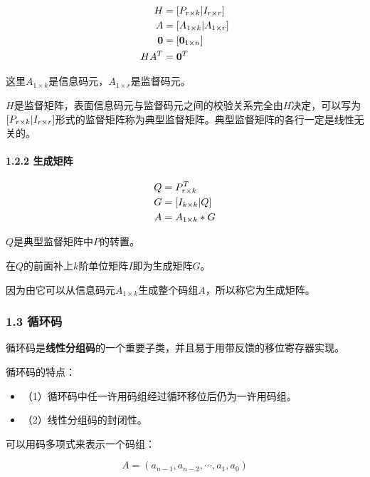 \documentclass[
]{article}
\begin{document}
\begin{align}
H &= [P_{r \times k} \space | \space I_{r \times r}]\\
A &= [A_{1 \times k} \space | \space A_{1 \times r}]\\
\boldsymbol0 &= [\boldsymbol0_{1 \times n}]\\
HA^T &= \boldsymbol0^T \\
\end{align}

这里$A_{1 \times k}$是信息码元，$A_{1 \times r}$是监督码元。

$H$是监督矩阵，表面信息码元与监督码元之间的校验关系完全由$H$决定，可以写为$[P_{r \times k} \space | \space I_{r \times r}]$形式的监督矩阵称为典型监督矩阵。典型监督矩阵的各行一定是线性无关的。

\hypertarget{header-n20}{%
\paragraph{1.2.2 生成矩阵}\label{header-n20}}

\begin{align}
Q &= P_{r \times k}^T\\
G &= [I_{k \times k} \space | \space Q]\\
A &= A_{1 \times k}*G\\
\end{align}

$Q$是典型监督矩阵中$P$的转置。

在$Q$的前面补上$k$阶单位矩阵$I$即为生成矩阵$G$。

因为由它可以从信息码元$A_{1 \times k}$生成整个码组$A$，所以称它为生成矩阵。

\hypertarget{header-n25}{%
\subsubsection{1.3 循环码}\label{header-n25}}

循环码是\textbf{线性分组码}的一个重要子类，并且易于用带反馈的移位寄存器实现。

循环码的特点：

\begin{itemize}
\item
  （1）循环码中任一许用码组经过循环移位后仍为一许用码组。
\item
  （2）线性分组码的封闭性。
\end{itemize}

可以用码多项式来表示一个码组：

$$A = (a_{n-1},a_{n-2},\cdots,a_{1},a_{0})$$
\end{document}
